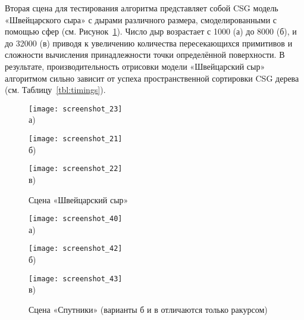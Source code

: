 Вторая сцена для тестирования алгоритма представляет собой CSG модель «Швейцарского сыра» с дырами различного размера, смоделированными с помощью сфер (см. Рисунок~\ref{fig:results_cheese}). Число дыр возрастает с 1000 (а) до 8000 (б), и до 32000 (в) приводя к увеличению количества пересекающихся примитивов и сложности вычисления принадлежности точки определённой поверхности. В результате, производительность отрисовки модели «Швейцарский сыр» алгоритмом сильно зависит от успеха пространственной сортировки CSG дерева (см. Таблицу~\ref{tbl:timings}).

\begin{figure}[ht]
  \begin{minipage}[ht]{0.325\linewidth}\centering
    \texttt{[image: screenshot\_23]} \\ а)
  \end{minipage}
  \hfill
  \begin{minipage}[ht]{0.325\linewidth}\centering
    \texttt{[image: screenshot\_21]} \\ б)
  \end{minipage}
  \hfill
  \begin{minipage}[ht]{0.325\linewidth}\centering
    \texttt{[image: screenshot\_22]} \\ в)
  \end{minipage}
  \caption{Сцена «Швейцарский сыр»}
  \label{fig:results_cheese}  
\end{figure}

\begin{figure}[ht]
  \begin{minipage}[ht]{0.325\linewidth}\centering
    \texttt{[image: screenshot\_40]} \\ а)
  \end{minipage}
  \hfill
  \begin{minipage}[ht]{0.325\linewidth}\centering
    \texttt{[image: screenshot\_42]} \\ б)
  \end{minipage}
  \hfill
  \begin{minipage}[ht]{0.325\linewidth}\centering
    \texttt{[image: screenshot\_43]} \\ в)
  \end{minipage}
  \caption{Сцена «Спутники» (варианты б и в отличаются только ракурсом)}
  \label{fig:results_sat}  
\end{figure}

